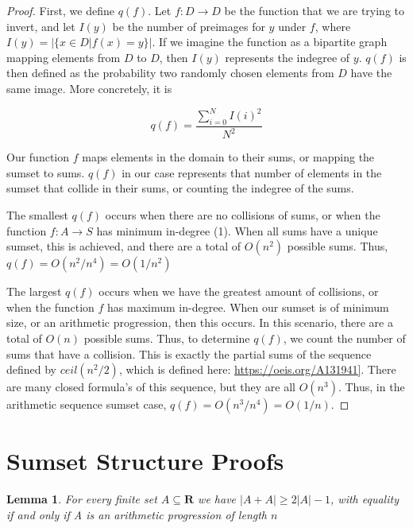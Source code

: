 \documentclass{article}
\newtheorem{lemma}{Lemma}
\begin{document}
\begin{proof}
First, we define $q(f)$. Let $f:D \rightarrow D$ be the function that we are trying to invert, and let $I(y)$ be the number of preimages for $y$ under $f$, where $I(y) = |\{x \in D|f(x) = y\}|$. If we imagine the function as a bipartite graph mapping elements from $D$ to $D$, then $I(y)$ represents the indegree of $y$. $q(f)$ is then defined as the probability two randomly chosen elements from $D$ have the same image. More concretely, it is

$$q(f) = \frac{\sum_{i=0}^N I(i)^2}{N^2}$$

Our function $f$ maps elements in the domain to their sums, or mapping the sumset to sums. $q(f)$ in our case represents that number of elements in the sumset that collide in their sums, or counting the indegree of the sums. 

The smallest $q(f)$ occurs when there are no collisions of sums, or when the function $f: A \rightarrow S$ has minimum in-degree (1). When all sums have a unique sumset, this is achieved, and there are a total of $O(n^2)$ possible sums. Thus, $q(f) = O(n^2/n^4)= O(1/n^2)$

The largest $q(f)$ occurs when we have the greatest amount of collisions, or when the function $f$ has maximum in-degree. When our sumset is of minimum size, or an arithmetic progression, then this occurs. In this scenario, there are a total of $O(n)$ possible sums. Thus, to determine $q(f)$, we count the number of sums that have a collision. This is exactly the partial sums of the sequence defined by $ceil(n^2/2)$, which is defined here: \url{https://oeis.org/A131941]}. There are many closed formula's of this sequence, but they are all $O(n^3)$. Thus, in the arithmetic sequence sumset case, $q(f) = O(n^3/n^4) = O(1/n)$.
\end{proof}

\section{Sumset Structure Proofs}
\label{sec:sumset}

\begin{lemma}
\label{Arithmetic Progression}
For every finite set $A \subseteq \mathbf{R}$ we have $|A+A| \geq 2|A|-1$, with equality if and only if A is an arithmetic progression of length $n$
\end{lemma}
\end{document}
